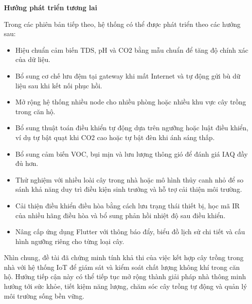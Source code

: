 \textbf{Hướng phát triển tương lai}

Trong các phiên bản tiếp theo, hệ thống có thể được phát triển theo các hướng sau:
\begin{itemize}
    \item Hiệu chuẩn cảm biến TDS, pH và CO2 bằng mẫu chuẩn để tăng độ chính xác của dữ liệu.
    \item Bổ sung cơ chế lưu đệm tại gateway khi mất Internet và tự động gửi bù dữ liệu sau khi kết nối phục hồi.
    \item Mở rộng hệ thống nhiều node cho nhiều phòng hoặc nhiều khu vực cây trồng trong căn hộ.
    \item Bổ sung thuật toán điều khiển tự động dựa trên ngưỡng hoặc luật điều khiển, ví dụ tự bật quạt khi CO2 cao hoặc tự bật đèn khi ánh sáng thấp.
    \item Bổ sung cảm biến VOC, bụi mịn và lưu lượng thông gió để đánh giá IAQ đầy đủ hơn.
    \item Thử nghiệm với nhiều loài cây trong nhà hoặc mô hình thủy canh nhỏ để so sánh khả năng duy trì điều kiện sinh trưởng và hỗ trợ cải thiện môi trường.
    \item Cải thiện điều khiển điều hòa bằng cách lưu trạng thái thiết bị, học mã IR của nhiều hãng điều hòa và bổ sung phản hồi nhiệt độ sau điều khiển.
    \item Nâng cấp ứng dụng Flutter với thông báo đẩy, biểu đồ lịch sử chi tiết và cấu hình ngưỡng riêng cho từng loại cây.
\end{itemize}

Nhìn chung, đề tài đã chứng minh tính khả thi của việc kết hợp cây trồng trong nhà với hệ thống IoT để giám sát và kiểm soát chất lượng không khí trong căn hộ. Hướng tiếp cận này có thể tiếp tục mở rộng thành giải pháp nhà thông minh hướng tới sức khỏe, tiết kiệm năng lượng, chăm sóc cây trồng tự động và quản lý môi trường sống bền vững.
